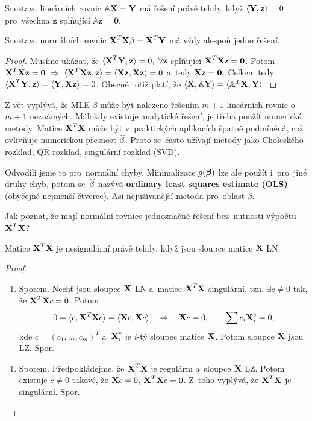 \begin{lemma}
	Soustava lineárních rovnic $\mathbb{A}\textbf{X}=\textbf{Y}$ má řešení právě tehdy, když $\langle \textbf{Y},\textbf{z}\rangle=0$ pro~všechna $\textbf{z}$ splňující $\mathbb{A}\textbf{z}=\textbf{0}$.
\end{lemma}
\begin{theorem}
	Soustava normálních rovnic $\textbf{X}^T\textbf{X}\beta=\textbf{X}^T\textbf{Y}$ má vždy alespoň jedno řešení.
	\begin{proof}
		Musíme ukázat, že $\langle \textbf{X}^T\textbf{Y},\textbf{z}\rangle=0,~\forall\textbf{z}$ splňující $\textbf{X}^T\textbf{X}\textbf{z}=\textbf{0}$. Potom
		$ \textbf{X}^T\textbf{X}\textbf{z}=\textbf{0}~\Rightarrow~ \langle \textbf{X}^T\textbf{X}\textbf{z},\textbf{z}\rangle=\langle \textbf{X}\textbf{z},\textbf{X}\textbf{z}\rangle=0$ a~tedy $\textbf{X}\textbf{z}=\textbf{0}$. Celkem tedy $\langle\textbf{X}^T\textbf{Y},\textbf{z}\rangle=\langle\textbf{Y},\textbf{X}\textbf{z}\rangle=0$. Obecně totiž platí, že $\langle \textbf{X},\mathbb{A}\textbf{Y}\rangle=\langle \mathbb{A}^T\textbf{X},\textbf{Y}\rangle$.
	\end{proof}
\end{theorem}
\begin{remark}
	Z vět vyplývá, že MLE $\beta$ může být nalezeno řešením $m+1$ lineárních rovnic o~$m+1$ neznámých. Málokdy existuje analytické řešení, je třeba použít numerické metody. Matice $\textbf{X}^T\textbf{X}$ může být v~praktických aplikacích špatně podmíněná, což ovlivňuje numerickou přesnost $\widehat{\beta}$. Proto se~často užívají metody jako Choleského rozklad, QR rozklad, singulární rozklad (SVD).
	
	Odvodili jsme to pro~normální chyby. Minimalizace $g(\boldsymbol{\beta})$ lze ale použít i~pro~jiné druhy chyb, potom se~$\widehat{\beta}$ nazývá \textbf{ordinary least squares estimate (OLS)} (obyčejné nejmenší čtverce). Asi nejužívanější metoda  pro~oblast $\beta$. 
	
	Jak poznat, že mají normální rovnice jednoznačné řešení bez~nutnosti výpočtu $\textbf{X}^T\textbf{X}$?
\end{remark}
\begin{theorem}
	Matice $\textbf{X}^T\textbf{X}$ je nesignulární právě tehdy, když jsou sloupce matice $\textbf{X}$ LN.
	\begin{proof}
		\begin{enumerate}[$\Leftarrow$]
			\item Sporem. Nechť jsou sloupce $\textbf{X}$ LN a~matice $\textbf{X}^T\textbf{X}$ singulární, tzn. $\exists c\neq0$ tak, že $\textbf{X}^T\textbf{X} c=0$. Potom
			$$ 0=\langle c,\textbf{X}^T\textbf{X} c\rangle=\langle \textbf{X} c,\textbf{X} c\rangle\quad \Rightarrow\quad\textbf{X} c=0,\qquad\sum c_i\textbf{X}_i^c=0,$$
			kde $c=(c_1,...,c_m)^T$ a~$\textbf{X}_i^c$ je $i$-tý sloupec matice $\textbf{X}$. Potom sloupce $\textbf{X}$ jsou LZ. Spor.
		\end{enumerate}
	\begin{enumerate}[$\Rightarrow$]
	\item Sporem. Předpokládejme, že $\textbf{X}^T\textbf{X}$ je regulární a~sloupce $\textbf{X}$ LZ. Potom existuje $c\neq0$ takové, že $\textbf{X} c=0$, $\textbf{X}^T\textbf{X} c=0$. Z~toho vyplývá, že $\textbf{X}^T\textbf{X}$ je singulární. Spor.
\end{enumerate}
	\end{proof}
\end{theorem}
